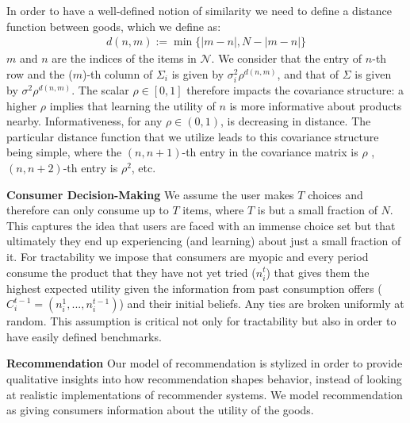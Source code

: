 \documentclass[sigconf]{acmart}
\begin{document}
In order to have a well-defined notion of similarity we need to define a distance function between goods, which we define as:
\begin{align*}
d(n,m):=\min\{ \lvert m - n \rvert ,N - \lvert m - n \rvert \}
\end{align*}
 $m$ and $n$ are the indices of the items in $\mathcal{N}$. We consider that the entry of $n$-th row and the ($m$)-th column of $\Sigma_i$ is given by $\sigma_i^2 \rho^{d(n,m)}$, and that of $\Sigma$ is given by $\sigma^2 \rho^{d(n,m)}$. The scalar $\rho \in [0,1]$ therefore impacts the covariance structure: a higher $\rho$ implies that learning the utility of $n$ is more informative about products nearby. Informativeness, for any $\rho \in (0,1)$, is decreasing in distance. The particular distance function that we utilize leads to this covariance structure being simple, where the $(n,n+1)$-th entry in the covariance matrix is $\rho$ , $(n,n+2)$-th entry is $\rho^2$, etc.
\par
\textbf{Consumer Decision-Making}
We assume the user makes $T$ choices and therefore can only consume up to $T$ items, where $T$ is but a small fraction of $N$. This captures the idea that users are faced with an immense choice set but that ultimately they end up experiencing (and learning) about just a small fraction of it. For tractability we impose that consumers are myopic and every period consume the product that they have not yet tried ($n_i^t$) that gives them the highest expected utility given the information from past consumption offers ($C_i^{t-1}=(n_i^1,...,n_i^{t-1})$) and their initial beliefs. Any ties are broken uniformly at random. This assumption is critical not only for tractability but also in order to have easily defined benchmarks.
\par
\noindent \textbf{Recommendation}
Our model of recommendation is stylized in order to provide qualitative insights into how recommendation shapes behavior, instead of looking at realistic implementations of recommender systems. We model recommendation as giving consumers information about the utility of the goods.
\end{document}
